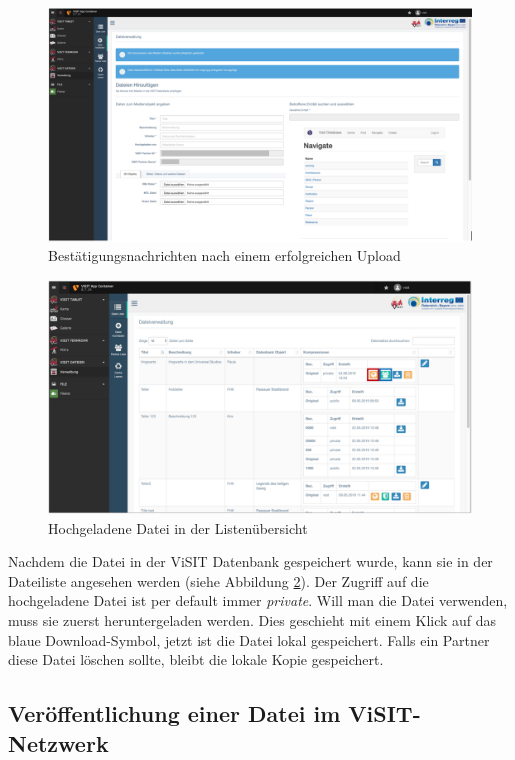 \begin{figure}[ht!]
\centering
\includegraphics[width=12cm]{Figures/paula/dateiverwaltung/bestaetigung_nach_hochladen.png}
\caption{Bestätigungsnachrichten nach einem erfolgreichen Upload}
\label{img:bestaetigung_nach_hochladen}
\end{figure}

\begin{figure}[ht!]
\centering
\includegraphics[width=12cm]{Figures/paula/dateiverwaltung/datei_in_listenuebersicht.png}
\caption{Hochgeladene Datei in der Listenübersicht}
\label{img:datei_in_listenuebersichtn}
\end{figure}

Nachdem die Datei in der ViSIT Datenbank gespeichert wurde, kann sie in der Dateiliste angesehen werden (siehe Abbildung \ref{img:datei_in_listenuebersichtn}). Der Zugriff auf die hochgeladene Datei ist per default immer \textit{private}. Will man die Datei verwenden, muss sie zuerst heruntergeladen werden. Dies geschieht mit einem Klick auf das blaue Download-Symbol, jetzt ist die Datei lokal gespeichert. 
Falls ein Partner diese Datei löschen sollte, bleibt die lokale Kopie gespeichert.


\subsection{Veröffentlichung einer Datei im ViSIT-Netzwerk}

